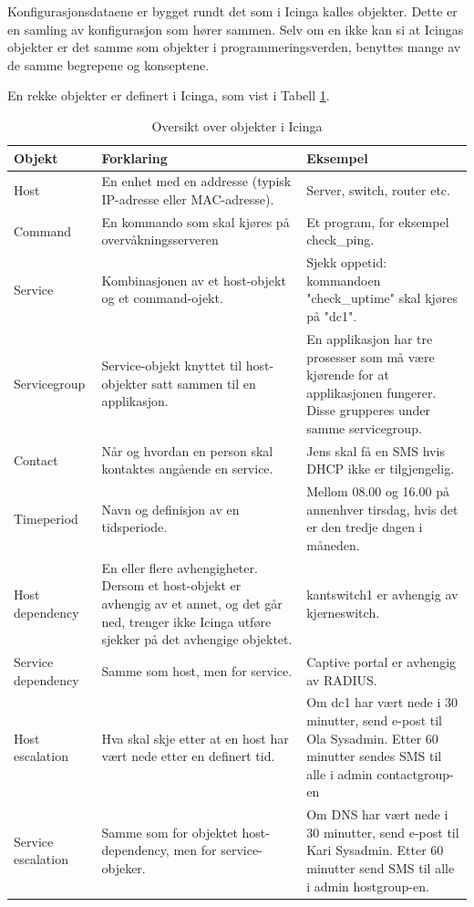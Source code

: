 Konfigurasjonsdataene er bygget rundt det som i Icinga kalles objekter. Dette er en samling av konfigurasjon som hører sammen. Selv om en ikke kan si at Icingas objekter er det samme som objekter i programmeringsverden, benyttes mange av de samme begrepene og konseptene.

En rekke objekter er definert i Icinga, som vist i Tabell \ref{objekter}.

\begin{changemargin}{-1cm}{-1cm}
\begin{table}
\begin{center}
\begin{tabular}{ | p{3.5cm} | p{6.5cm} | p{6cm} |} \hline
	\textbf{Objekt} & \textbf{Forklaring} & \textbf{Eksempel} \\ \hline
	Host & En enhet med en addresse (typisk IP-adresse eller MAC-adresse). & Server, switch, router etc. \\ \hline
	Command & En kommando som skal kjøres på overvåkningsserveren & Et program, for eksempel check\_ping. \\ \hline 
	Service & Kombinasjonen av et host-objekt og et command-ojekt. & Sjekk oppetid: kommandoen "check\_uptime" skal kjøres på "dc1". \\ \hline
	Servicegroup & Service-objekt knyttet til host-objekter satt sammen til en applikasjon. & En applikasjon har tre prosesser som må være kjørende for at applikasjonen fungerer. Disse grupperes under samme servicegroup. \\ \hline
	Contact & Når og hvordan en person skal kontaktes angående en service. & Jens skal få en SMS hvis DHCP ikke er tilgjengelig. \\ \hline
	Timeperiod & Navn og definisjon av en tidsperiode. & Mellom 08.00 og 16.00 på annenhver tirsdag, hvis det er den tredje dagen i måneden. \\ \hline
	Host dependency & En eller flere avhengigheter. Dersom et host-objekt er avhengig av et annet, og det går ned, trenger ikke Icinga utføre sjekker på det avhengige objektet. & kantswitch1 er avhengig av kjerneswitch. \\ \hline
	Service dependency & Samme som host, men for service. & Captive portal er avhengig av RADIUS. \\ \hline
	Host escalation & Hva skal skje etter at en host har vært nede etter en definert tid. &	Om dc1 har vært nede i 30 minutter, send e-post til Ola Sysadmin. Etter 60 minutter sendes SMS til alle i admin contactgroup-en \\ \hline
	Service escalation & Samme som for objektet host-dependency, men for service-objeker. & Om DNS har vært nede i 30 minutter, send e-post til Kari Sysadmin. Etter 60 minutter send SMS til alle i admin hostgroup-en. \\ \hline
	\end{tabular}
	\caption{Oversikt over objekter i Icinga}
	\label{objekter}
\end{center}
\end{table}
\end{changemargin}

